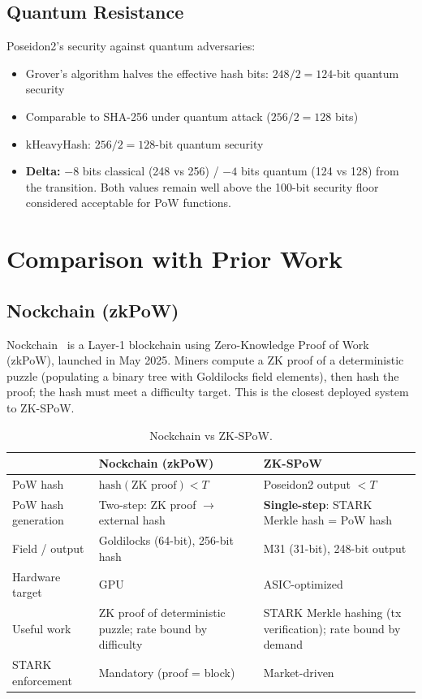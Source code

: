 \documentclass[11pt,a4paper]{article}
\begin{document}
\subsection{Quantum Resistance}

Poseidon2's security against quantum adversaries:
\begin{itemize}
\item Grover's algorithm halves the effective hash bits: $248/2 = 124$-bit quantum security
\item Comparable to SHA-256 under quantum attack ($256/2 = 128$ bits)
\item kHeavyHash: $256/2 = 128$-bit quantum security
\item \textbf{Delta:} $-8$ bits classical (248 vs 256) / $-4$ bits quantum (124 vs 128) from the transition. Both values remain well above the 100-bit security floor considered acceptable for PoW functions.
\end{itemize}

\section{Comparison with Prior Work}
\label{sec:comparison}

\subsection{Nockchain (zkPoW)}

Nockchain~\cite{nockchain} is a Layer-1 blockchain using Zero-Knowledge Proof of Work (zkPoW), launched in May 2025. Miners compute a ZK proof of a deterministic puzzle (populating a binary tree with Goldilocks field elements), then hash the proof; the hash must meet a difficulty target. This is the closest deployed system to ZK-SPoW.

\begin{table}[h]
\centering
\small
\begin{tabular}{@{}lp{}p{}@{}}
\toprule
& Nockchain (zkPoW) & ZK-SPoW \\
\midrule
PoW hash & $\mathrm{hash}(\text{ZK proof}) < T$ & Poseidon2 output $< T$ \\
PoW hash generation & Two-step: ZK proof $\to$ external hash & \textbf{Single-step}: STARK Merkle hash = PoW hash \\
Field / output & Goldilocks (64-bit), 256-bit hash & M31 (31-bit), 248-bit output \\
Hardware target & GPU & ASIC-optimized \\
Useful work & ZK proof of deterministic puzzle; rate bound by difficulty & STARK Merkle hashing (tx verification); rate bound by demand \\
STARK enforcement & Mandatory (proof = block) & Market-driven \\
\bottomrule
\end{tabular}
\caption{Nockchain vs ZK-SPoW.}
\label{tab:nockchain}
\end{table}
\end{document}
